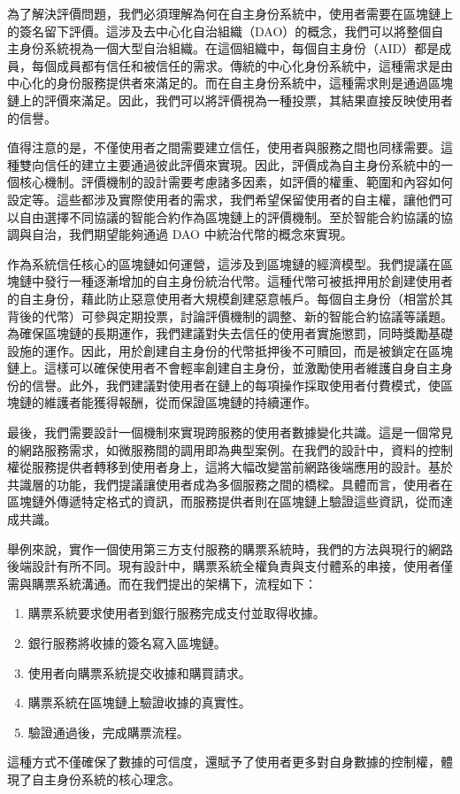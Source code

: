為了解決評價問題，我們必須理解為何在自主身份系統中，使用者需要在區塊鏈上的簽名留下評價。這涉及去中心化自治組織（DAO）的概念，我們可以將整個自主身份系統視為一個大型自治組織。在這個組織中，每個自主身份（AID）都是成員，每個成員都有信任和被信任的需求。傳統的中心化身份系統中，這種需求是由中心化的身份服務提供者來滿足的。而在自主身份系統中，這種需求則是通過區塊鏈上的評價來滿足。因此，我們可以將評價視為一種投票，其結果直接反映使用者的信譽。

值得注意的是，不僅使用者之間需要建立信任，使用者與服務之間也同樣需要。這種雙向信任的建立主要通過彼此評價來實現。因此，評價成為自主身份系統中的一個核心機制。評價機制的設計需要考慮諸多因素，如評價的權重、範圍和內容如何設定等。這些都涉及實際使用者的需求，我們希望保留使用者的自主權，讓他們可以自由選擇不同協議的智能合約作為區塊鏈上的評價機制。至於智能合約協議的協調與自治，我們期望能夠通過 DAO 中統治代幣的概念來實現。

作為系統信任核心的區塊鏈如何運營，這涉及到區塊鏈的經濟模型。我們提議在區塊鏈中發行一種逐漸增加的自主身份統治代幣。這種代幣可被抵押用於創建使用者的自主身份，藉此防止惡意使用者大規模創建惡意帳戶。每個自主身份（相當於其背後的代幣）可參與定期投票，討論評價機制的調整、新的智能合約協議等議題。為確保區塊鏈的長期運作，我們建議對失去信任的使用者實施懲罰，同時獎勵基礎設施的運作。因此，用於創建自主身份的代幣抵押後不可贖回，而是被鎖定在區塊鏈上。這樣可以確保使用者不會輕率創建自主身份，並激勵使用者維護自身自主身份的信譽。此外，我們建議對使用者在鏈上的每項操作採取使用者付費模式，使區塊鏈的維護者能獲得報酬，從而保證區塊鏈的持續運作。

最後，我們需要設計一個機制來實現跨服務的使用者數據變化共識。這是一個常見的網路服務需求，如微服務間的調用即為典型案例。在我們的設計中，資料的控制權從服務提供者轉移到使用者身上，這將大幅改變當前網路後端應用的設計。基於共識層的功能，我們提議讓使用者成為多個服務之間的橋樑。具體而言，使用者在區塊鏈外傳遞特定格式的資訊，而服務提供者則在區塊鏈上驗證這些資訊，從而達成共識。

舉例來說，實作一個使用第三方支付服務的購票系統時，我們的方法與現行的網路後端設計有所不同。現有設計中，購票系統全權負責與支付體系的串接，使用者僅需與購票系統溝通。而在我們提出的架構下，流程如下：
\begin{enumerate}
  \item 購票系統要求使用者到銀行服務完成支付並取得收據。
  \item 銀行服務將收據的簽名寫入區塊鏈。
  \item 使用者向購票系統提交收據和購買請求。
  \item 購票系統在區塊鏈上驗證收據的真實性。
  \item 驗證通過後，完成購票流程。
\end{enumerate}
這種方式不僅確保了數據的可信度，還賦予了使用者更多對自身數據的控制權，體現了自主身份系統的核心理念。
